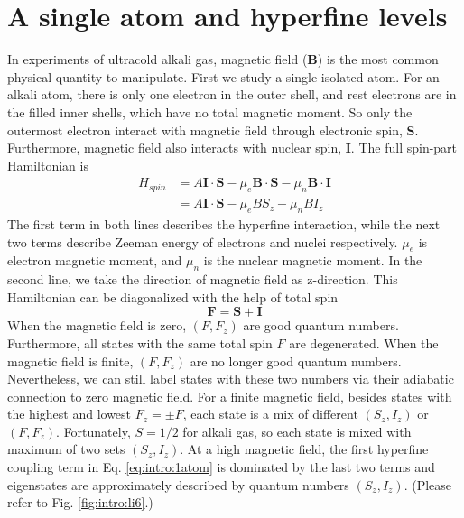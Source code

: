 \section{A single atom and hyperfine levels}
In experiments of ultracold alkali gas, magnetic field ($\mathbf{B}$) is the most common physical quantity to manipulate.  First we study a  single isolated atom.  For an alkali atom, there is only one electron in the outer shell, and rest electrons are in the filled inner shells, which have no total magnetic moment.  So only the outermost electron interact with magnetic field through electronic spin, $\mathbf{S}$.  Furthermore, magnetic field also interacts with nuclear spin, $\mathbf{I}$.  The full spin-part Hamiltonian is
\begin{equation}
\begin{split}\label{eq:intro:1atom}
H_{spin}&=A \mathbf{I}\cdot\mathbf{S}-\mu_{e}\mathbf{B}\cdot\mathbf{S}-{\mu}_{n}\mathbf{B}\cdot\mathbf{I}\\
&=A \mathbf{I}\cdot\mathbf{S}-\mu_{e}{B}{S_{z}}-{\mu}_{n}{B}{I_{z}}
\end{split}
\end{equation}
The first term in both lines describes the hyperfine interaction, while the next two terms describe Zeeman energy of electrons and nuclei respectively. $\mu_{e}$ is electron magnetic moment, and $\mu_n$ is the nuclear magnetic moment.  In the second line, we take the direction of magnetic field as z-direction. This Hamiltonian can be diagonalized with the help of total spin 
\begin{equation}
\mathbf{F}=\mathbf{S}+\mathbf{I}
\end{equation}
When the magnetic field is zero, $(F,F_{z})$ are good quantum numbers. Furthermore, all states with the same total spin $F$ are degenerated.   When the magnetic field is finite, $(F,F_{z})$ are no longer good quantum numbers. Nevertheless, we can still label states with these two numbers via their adiabatic connection to zero magnetic field.  For a finite magnetic field, besides states with the highest and lowest $F_{z}=\pm{}F$, each state is a mix of different $(S_{z}, I_{z})$ or $(F,F_z)$.  Fortunately, $S=1/2$ for alkali gas,  so each state is mixed with maximum of two sets $(S_{z}, I_{z})$. At a high magnetic field, the first hyperfine coupling term in Eq. \eqref{eq:intro:1atom} is dominated by the last two terms and  eigenstates are approximately described by quantum numbers $(S_{z},I_{z})$.  (Please refer to Fig. \ref{fig:intro:li6}.)

